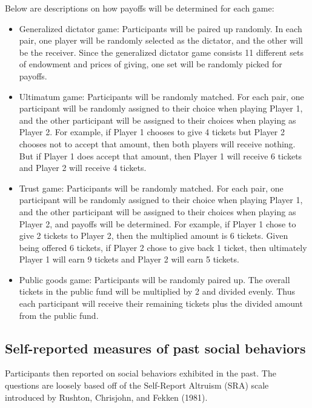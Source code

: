 \documentclass{article}
\begin{document}
Below are descriptions on how payoffs will be determined for each game: 

\begin{itemize}

\item Generalized dictator game: Participants will be paired up randomly. In each pair, one player will be randomly selected as the dictator, and the other will be the receiver.  Since the generalized dictator game consists 11 different sets of endowment and prices of giving, one set will be randomly picked for payoffs.

\item Ultimatum game: Participants will be randomly matched. For each pair, one participant will be randomly assigned to their choice when playing Player 1, and the other participant will be assigned to their choices when playing as Player 2. For example, if Player 1 chooses to give 4 tickets but Player 2 chooses not to accept that amount, then both players will receive nothing. But if Player 1 does accept that amount, then Player 1 will receive 6 tickets and Player 2 will receive 4 tickets.

\item Trust game: Participants will be randomly matched. For each pair, one participant will be randomly assigned to their choice when playing Player 1, and the other participant will be assigned to their choices when playing as Player 2, and payoffs will be determined. For example, if Player 1 chose to give 2 tickets to Player 2, then the multiplied amount is 6 tickets. Given being offered 6 tickets, if Player 2 chose to give back 1 ticket, then ultimately Player 1 will earn 9 tickets and Player 2 will earn 5 tickets.

\item Public goods game: Participants will be randomly paired up. The overall tickets in the public fund will be multiplied by 2 and divided evenly. Thus each participant will receive their remaining tickets plus the divided amount from the public fund.

\end{itemize}

\subsection{Self-reported measures of past social behaviors}

Participants then reported on social behaviors exhibited in the past. The questions are loosely based off of the Self-Report Altruism (SRA) scale introduced by Rushton, Chrisjohn, and Fekken (1981). 
\end{document}

